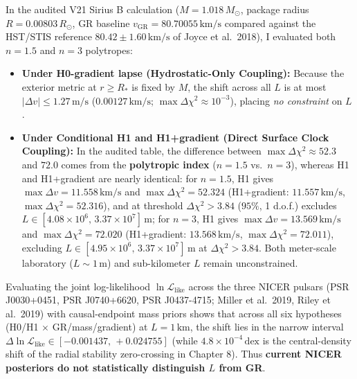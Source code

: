 \documentclass[10pt,a4paper]{article}
\begin{document}
\par
In the audited V21 Sirius B calculation ($M = 1.018\,M_\odot$, package radius $R = 0.00803\,R_\odot$, GR baseline $v_{\text{GR}} = 80.70055\,\text{km/s}$ compared against the HST/STIS reference $80.42 \pm 1.60\,\text{km/s}$ of Joyce et al.\ 2018), I evaluated both $n=1.5$ and $n=3$ polytropes:
\begin{itemize}\setlength{\itemsep}{1.5pt}\setlength{\parskip}{0pt}\setlength{\topsep}{1pt}
  \item \textbf{Under H0-gradient lapse (Hydrostatic-Only Coupling):} Because the exterior metric at $r \ge R_*$ is fixed by $M$, the shift across all $L$ is at most \textbf{$|\Delta v| \le 1.27\,\text{m/s}$} ($0.00127\,\text{km/s}$; $\max\Delta\chi^2 \approx 10^{-3}$), placing \emph{no constraint} on $L$.
  \item \textbf{Under Conditional H1 and H1+gradient (Direct Surface Clock Coupling):} In the audited table, the difference between $\max\Delta\chi^2 \approx 52.3$ and $72.0$ comes from the \textbf{polytropic index} ($n=1.5$ vs.\ $n=3$), whereas H1 and H1+gradient are nearly identical: for \textbf{$n=1.5$}, H1 gives $\max\Delta v = 11.558\,\text{km/s}$ and $\max\Delta\chi^2 = 52.324$ (H1+gradient: $11.557\,\text{km/s}$, $\max\Delta\chi^2 = 52.316$), and at threshold $\Delta\chi^2 > 3.84$ ($95\%$, 1 d.o.f.) excludes \textbf{$L \in [4.08\times 10^6,\, 3.37\times 10^7]\,\text{m}$}; for \textbf{$n=3$}, H1 gives $\max\Delta v = 13.569\,\text{km/s}$ and $\max\Delta\chi^2 = 72.020$ (H1+gradient: $13.568\,\text{km/s}$, $\max\Delta\chi^2 = 72.011$), excluding \textbf{$L \in [4.95\times 10^6,\, 3.37\times 10^7]\,\text{m}$} at $\Delta\chi^2 > 3.84$. Both meter-scale laboratory ($L \sim 1\,\text{m}$) and sub-kilometer $L$ remain unconstrained.
\end{itemize}

\par
Evaluating the joint log-likelihood $\ln\mathcal{L}_{\text{like}}$ across the three NICER pulsars (PSR J0030+0451, PSR J0740+6620, PSR J0437-4715; Miller et al.\ 2019, Riley et al.\ 2019) with causal-endpoint mass priors shows that across all six hypotheses (H0/H1 $\times$ GR/mass/gradient) at $L = 1\,\text{km}$, the shift lies in the narrow interval \textbf{$\Delta\ln\mathcal{L}_{\text{like}} \in [-0.001437,\, +0.024755]$} (while $4.8\times 10^{-4}\,\text{dex}$ is the central-density shift of the radial stability zero-crossing in Chapter 8). Thus \textbf{current NICER posteriors do not statistically distinguish $L$ from GR}.
\newpage
\end{document}
